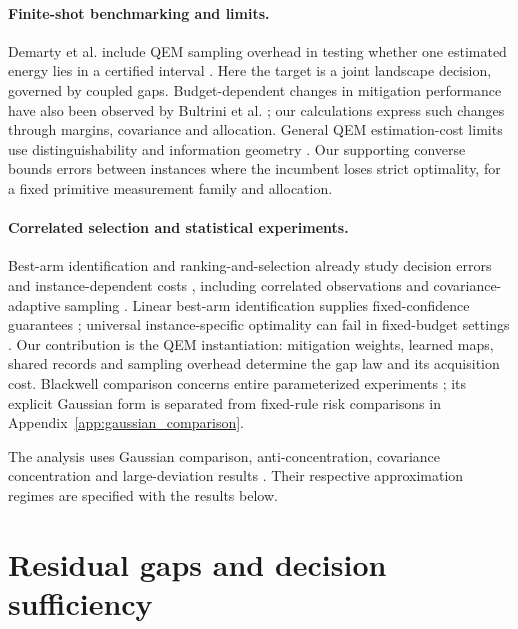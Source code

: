 \documentclass[a4paper,onecolumn,unpublished,nopdfoutputerror]{quantumarticle}
\theoremstyle{plain}
\theoremstyle{definition}
\newcommand{\1}{\mathbf{1}}
\begin{document}
\paragraph{Finite-shot benchmarking and limits.}
Demarty et al. include QEM sampling overhead in testing whether one estimated energy lies in a certified interval \cite{Demarty2026}. Here the target is a joint landscape decision, governed by coupled gaps. Budget-dependent changes in mitigation performance have also been observed by Bultrini et al. \cite{Bultrini2023}; our calculations express such changes through margins, covariance and allocation. General QEM estimation-cost limits use distinguishability and information geometry \cite{Takagi2022,Takagi2023,Tsubouchi2022,Quek2024}. Our supporting converse bounds errors between instances where the incumbent loses strict optimality, for a fixed primitive measurement family and allocation.

\paragraph{Correlated selection and statistical experiments.}
Best-arm identification and ranking-and-selection already study decision errors and instance-dependent costs \cite{Bechhofer1954,GuptaPanchapakesan1979,GarivierKaufmann2016}, including correlated observations and covariance-adaptive sampling \cite{GuptaJoshiYagan2021,Saad2023}. Linear best-arm identification supplies fixed-confidence guarantees \cite{JedraProutiere2020}; universal instance-specific optimality can fail in fixed-budget settings \cite{Degenne2023}. Our contribution is the QEM instantiation: mitigation weights, learned maps, shared records and sampling overhead determine the gap law and its acquisition cost. Blackwell comparison concerns entire parameterized experiments \cite{Blackwell1953}; its explicit Gaussian form is separated from fixed-rule risk comparisons in Appendix~\ref{app:gaussian_comparison}.

The analysis uses Gaussian comparison, anti-concentration, covariance concentration and large-deviation results \cite{Slepian1962,Sidak1967,LedouxTalagrand1991,Chernozhukov2013,Boucheron2013,Vershynin2018,KoltchinskiiLounici2017,DemboZeitouni1998}. Their respective approximation regimes are specified with the results below.

\section{Residual gaps and decision sufficiency}
\label{sec:decision_gaps}
\end{document}
